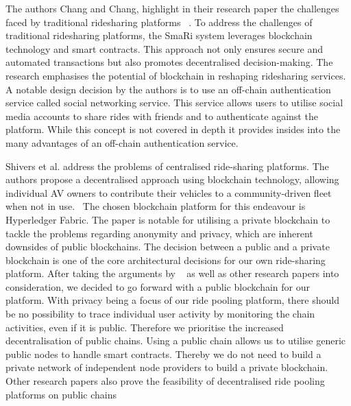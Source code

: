 The authors Chang and Chang, highlight in their research paper the challenges faced by traditional ridesharing platforms ~\cite{Chang.}. To address the challenges of traditional ridesharing platforms, the SmaRi system leverages blockchain technology and smart contracts. This approach not only ensures secure and automated transactions but also promotes decentralised decision-making. The research emphasises the potential of blockchain in reshaping ridesharing services. A notable design decision by the authors is to use an off-chain authentication service called social networking service. This service allows users to utilise social media accounts to share rides with friends and to authenticate against the platform. While this concept is not covered in depth it provides insides into the many advantages of an off-chain authentication service.

Shivers et al. address the problems of centralised ride-sharing platforms. The authors propose a decentralised approach using blockchain technology, allowing individual AV owners to contribute their vehicles to a community-driven fleet when not in use.~\cite{Shivers.} The chosen blockchain platform for this endeavour is Hyperledger Fabric. The paper is notable for utilising a private blockchain to tackle the problems regarding anonymity and privacy, which are inherent downsides of public blockchains. The decision between a public and a private blockchain is one of the core architectural decisions for our own ride-sharing platform.  After taking the arguments by ~\cite{Shivers.} as well as other research papers into consideration, we decided to go forward with a public blockchain for our platform. With privacy being a focus of our ride pooling platform, there should be no possibility to trace individual user activity by monitoring the chain activities, even if it is public. Therefore we prioritise the increased decentralisation of public chains. Using a public chain allows us to utilise generic public nodes to handle smart contracts. Thereby we do not need to build a private network of independent node providers to build a private blockchain. Other research papers also prove the feasibility of decentralised ride pooling platforms on public chains ~\cite{Mahmoud.2022} ~\cite{Joseph.} ~\cite{Baza.52520205282020}

